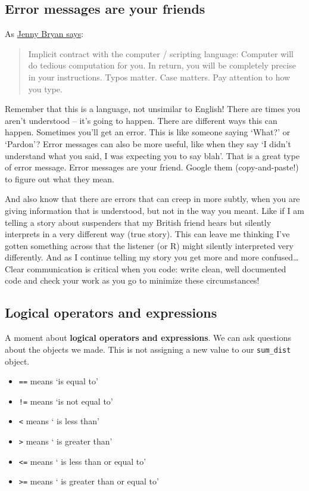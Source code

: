 \documentclass[]{book}
\providecommand{\tightlist}{%
  \setlength{\itemsep}{0pt}\setlength{\parskip}{0pt}}
\begin{document}
\hypertarget{error-messages-are-your-friends}{%
\subsection{Error messages are your friends}\label{error-messages-are-your-friends}}

As \href{https://stat545.com/r-basics.html}{Jenny Bryan says}:

\begin{quote}
Implicit contract with the computer / scripting language: Computer will do tedious computation for you. In return, you will be completely precise in your instructions. Typos matter. Case matters. Pay attention to how you type.
\end{quote}

Remember that this is a language, not unsimilar to English! There are times you aren't understood -- it's going to happen. There are different ways this can happen. Sometimes you'll get an error. This is like someone saying `What?' or `Pardon'? Error messages can also be more useful, like when they say `I didn't understand what you said, I was expecting you to say blah'. That is a great type of error message. Error messages are your friend. Google them (copy-and-paste!) to figure out what they mean.

And also know that there are errors that can creep in more subtly, when you are giving information that is understood, but not in the way you meant. Like if I am telling a story about suspenders that my British friend hears but silently interprets in a very different way (true story). This can leave me thinking I've gotten something across that the listener (or R) might silently interpreted very differently. And as I continue telling my story you get more and more confused\ldots{} Clear communication is critical when you code: write clean, well documented code and check your work as you go to minimize these circumstances!

\hypertarget{logical-operators-and-expressions}{%
\subsection{Logical operators and expressions}\label{logical-operators-and-expressions}}

A moment about \textbf{logical operators and expressions}. We can ask questions about the objects we made. This is not assigning a new value to our \texttt{sum\_dist} object.

\begin{itemize}
\tightlist
\item
  \texttt{==} means `is equal to'
\item
  \texttt{!=} means `is not equal to'
\item
  \texttt{\textless{}} means ` is less than'
\item
  \texttt{\textgreater{}} means ` is greater than'
\item
  \texttt{\textless{}=} means ` is less than or equal to'
\item
  \texttt{\textgreater{}=} means ` is greater than or equal to'
\end{itemize}
\end{document}
